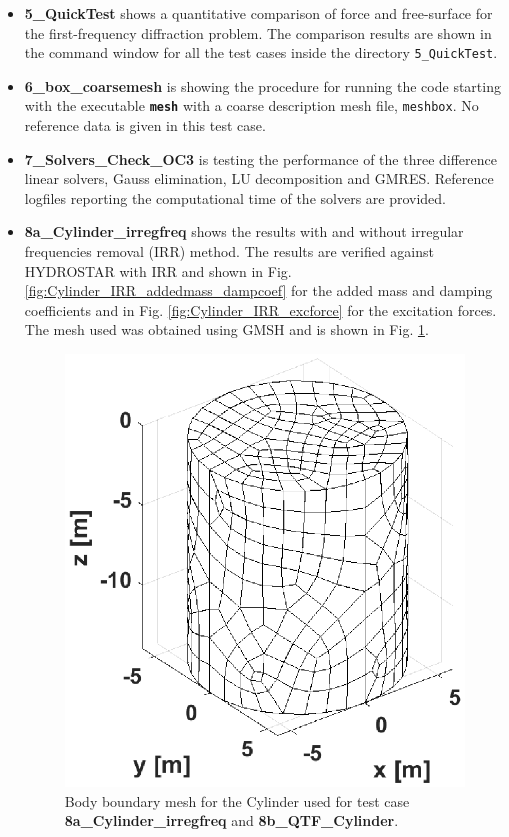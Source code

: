 \documentclass[12pt,a4paper,titlepage]{article}
\begin{document}
\begin{itemize}
\item \textbf{5\_QuickTest} shows a quantitative comparison of force and free-surface for the first-frequency diffraction problem. The comparison results are shown in the command window for all the test cases inside the directory \texttt{5\_QuickTest}.

\item \textbf{6\_box\_coarsemesh} is showing the procedure for running the code starting with the executable \textbf{\texttt{mesh}} with a coarse description mesh file, \texttt{meshbox}. No reference data is given in this test case.

\item \textbf{7\_Solvers\_Check\_OC3} is testing the performance of the three difference linear solvers, Gauss elimination, LU decomposition and GMRES. Reference logfiles reporting the computational time of the solvers are provided.

\item \textbf{8a\_Cylinder\_irregfreq} shows the results with and without irregular frequencies removal (IRR) method. The results are verified against HYDROSTAR with IRR and shown in Fig. \ref{fig:Cylinder_IRR_addedmass_dampcoef} for the added mass and damping coefficients and in Fig. \ref{fig:Cylinder_IRR_excforce} for the excitation forces. The mesh used was obtained using GMSH \cite{gmsh} and is shown in Fig. \ref{fig:meshesCylinder}.

\begin{figure}[h!tbp]
\centering
\includegraphics[scale=0.5,trim = 0mm 0mm 0mm 0mm, clip]{figures/Cylinder/mesh.eps}	
\caption{Body boundary mesh for the Cylinder used for test case \textbf{8a\_Cylinder\_irregfreq} and \textbf{8b\_QTF\_Cylinder}.}\label{fig:meshesCylinder}
\end{figure}


\end{itemize}
\end{document}
